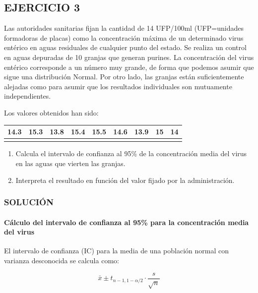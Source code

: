 \documentclass[
]{article}
\providecommand{\tightlist}{%
  \setlength{\itemsep}{0pt}\setlength{\parskip}{0pt}}
\begin{document}
\subsection{EJERCICIO 3}\label{ejercicio-3-3}

Las autoridades sanitarias fijan la cantidad de 14 UFP/100ml (UFP=unidades formadoras de placas) como la concentración máxima de un determinado virus entérico en aguas residuales de cualquier punto del estado. Se realiza un control en aguas depuradas de 10 granjas que generan purines. La concentración del virus entérico corresponde a un número muy grande, de forma que podemos asumir que sigue una distribución Normal. Por otro lado, las granjas están suficientemente alejadas como para asumir que los resultados individuales son mutuamente independientes.

Los valores obtenidos han sido:

\begin{longtable}[]{@{}lllllllll@{}}
\toprule\noalign{}
14.3 & 15.3 & 13.8 & 15.4 & 15.5 & 14.6 & 13.9 & 15 & 14 \\
\midrule\noalign{}
\endhead
\bottomrule\noalign{}
\endlastfoot
\end{longtable}

\begin{enumerate}
\def\labelenumi{\arabic{enumi}.}
\tightlist
\item
  Calcula el intervalo de confianza al 95\% de la concentración media del virus en las aguas que vierten las granjas.\\
\item
  Interpreta el resultado en función del valor fijado por la administración.
\end{enumerate}

\subsubsection{SOLUCIÓN}\label{soluciuxf3n-17}

\paragraph{Cálculo del intervalo de confianza al 95\% para la concentración media del virus}\label{cuxe1lculo-del-intervalo-de-confianza-al-95-para-la-concentraciuxf3n-media-del-virus}

El intervalo de confianza (IC) para la media de una población normal con varianza desconocida se calcula como:

\[ \bar{x} \pm t_{n-1, 1-\alpha/2} \cdot \frac{s}{\sqrt{n}} \]
\end{document}
